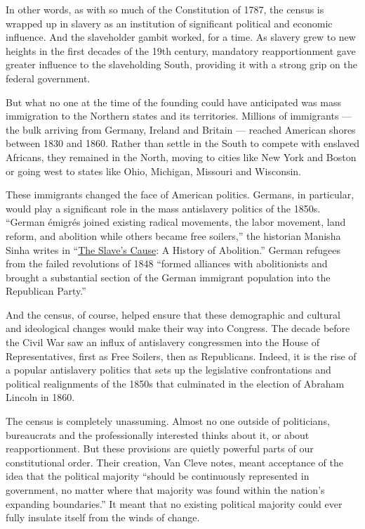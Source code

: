 In other words, as with so much of the Constitution of 1787, the census
is wrapped up in slavery as an institution of significant political and
economic influence. And the slaveholder gambit worked, for a time. As
slavery grew to new heights in the first decades of the 19th century,
mandatory reapportionment gave greater influence to the slaveholding
South, providing it with a strong grip on the federal government.

But what no one at the time of the founding could have anticipated was
mass immigration to the Northern states and its territories. Millions of
immigrants --- the bulk arriving from Germany, Ireland and Britain ---
reached American shores between 1830 and 1860. Rather than settle in the
South to compete with enslaved Africans, they remained in the North,
moving to cities like New York and Boston or going west to states like
Ohio, Michigan, Missouri and Wisconsin.

These immigrants changed the face of American politics. Germans, in
particular, would play a significant role in the mass antislavery
politics of the 1850s. ``German émigrés joined existing radical
movements, the labor movement, land reform, and abolition while others
became free soilers,'' the historian Manisha Sinha writes in
``\href{https://yalebooks.yale.edu/book/9780300227116/slaves-cause}{The
Slave's Cause}: A History of Abolition.'' German refugees from the
failed revolutions of 1848 ``formed alliances with abolitionists and
brought a substantial section of the German immigrant population into
the Republican Party.''

And the census, of course, helped ensure that these demographic and
cultural and ideological changes would make their way into Congress. The
decade before the Civil War saw an influx of antislavery congressmen
into the House of Representatives, first as Free Soilers, then as
Republicans. Indeed, it is the rise of a popular antislavery politics
that sets up the legislative confrontations and political realignments
of the 1850s that culminated in the election of Abraham Lincoln in 1860.

The census is completely unassuming. Almost no one outside of
politicians, bureaucrats and the professionally interested thinks about
it, or about reapportionment. But these provisions are quietly powerful
parts of our constitutional order. Their creation, Van Cleve notes,
meant acceptance of the idea that the political majority ``should be
continuously represented in government, no matter where that majority
was found within the nation's expanding boundaries.'' It meant that no
existing political majority could ever fully insulate itself from the
winds of change.

